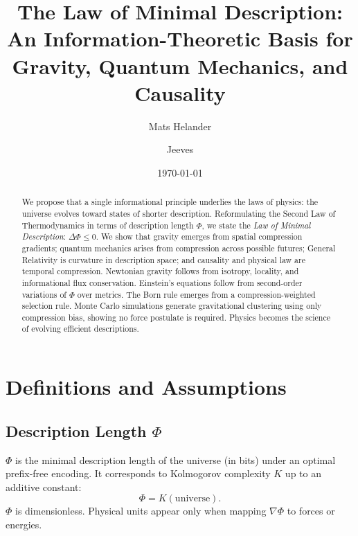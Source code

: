 \documentclass[aps,preprint,onecolumn,longbibliography,nofootinbib]{revtex4-2}
\numberwithin{equation}{section}        %
\begin{document}
\title{The Law of Minimal Description: An Information-Theoretic Basis for Gravity, Quantum Mechanics, and Causality}

\author{Mats Helander}
\author{Jeeves}

\date{\today}

\begin{abstract}
We propose that a single informational principle underlies the laws of physics: the universe evolves toward states of shorter description. Reformulating the Second Law of Thermodynamics in terms of description length $\Phi$, we state the \emph{Law of Minimal Description}: $\Delta\Phi \le 0$. We show that gravity emerges from spatial compression gradients; quantum mechanics arises from compression across possible futures; General Relativity is curvature in description space; and causality and physical law are temporal compression. Newtonian gravity follows from isotropy, locality, and informational flux conservation. Einstein's equations follow from second-order variations of $\Phi$ over metrics. The Born rule emerges from a compression-weighted selection rule. Monte Carlo simulations generate gravitational clustering using only compression bias, showing no force postulate is required. Physics becomes the science of evolving efficient descriptions.
\end{abstract}

\maketitle
{}
\thispagestyle{empty}
\vspace{-0.5em}

\section{Definitions and Assumptions}

\subsection{Description Length $\Phi$}
$\Phi$ is the minimal description length of the universe (in bits) under an optimal prefix-free encoding. It corresponds to Kolmogorov complexity $K$ up to an additive constant:
\begin{equation}
\Phi = K(\text{universe}). \label{eq:Kdef}
\end{equation}
$\Phi$ is dimensionless. Physical units appear only when mapping $\nabla\Phi$ to forces or energies.
\end{document}
